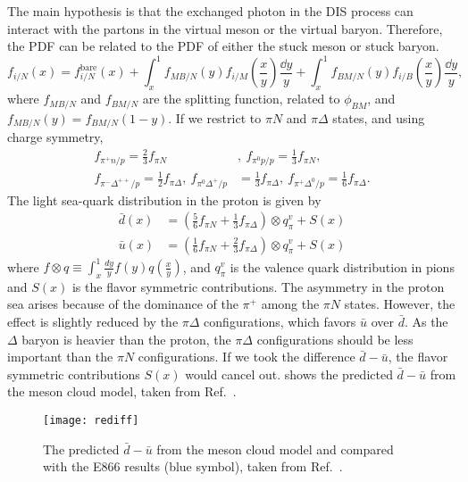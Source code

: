 \documentclass[../main.tex]{subfiles}
\begin{document}
The main hypothesis is that the exchanged photon in the DIS process can interact with the partons in the
virtual meson or the virtual
baryon. Therefore, the PDF can be related to the PDF of either the stuck meson or stuck baryon.
\begin{equation}
	f_{i/N}\left(x\right) = f_{i/N}^{\mathrm{bare}}\left(x\right) +  \int^1_x f_{MB/N}\left(y\right) f_{i/M}\left(\frac{x}{y}\right) \frac{\dd{y}}{y} + \int^1_x f_{BM/N}\left(y\right) f_{i/B}\left(\frac{x}{y}\right) \frac{\dd{y}}{y},
\end{equation}
where $f_{MB/N}$ and $f_{BM/N}$ are the splitting function, related to $\phi_{BM}$, and $f_{MB/N}(y)=f_{BM/N}(1-y)$.
If we restrict to $\pi N$ and $\pi\Delta$ states, and using charge symmetry,
\begin{align}
	f_{\pi^+n/p}=\frac{2}{3} f_{\pi N}                                       & , ~f_{\pi^0 p/p}=\frac{1}{3} f_{\pi N},                                         \\
	f_{\pi^-\Delta^{++}/p}=\frac{1}{2} f_{\pi \Delta}, ~f_{\pi^0 \Delta^+/p} & =\frac{1}{3} f_{\pi \Delta},  ~f_{\pi^+ \Delta^0/p}=\frac{1}{6} f_{\pi \Delta}.
\end{align}
The light sea-quark distribution in the proton is given by
\begin{align}
	\bar{d}(x) & = \left(\frac{5}{6}f_{\pi N} + \frac{1}{3}f_{\pi \Delta}\right)\otimes q^v_\pi + S(x) \\
	\bar{u}(x) & = \left(\frac{1}{6}f_{\pi N} + \frac{2}{3}f_{\pi \Delta}\right)\otimes q^v_\pi + S(x)
	\label{eq:pion_dbub}
\end{align}
where $f\otimes q\equiv \int^1_x \frac{dy}{y}f(y)q\left(\frac{x}{y}\right)$, and $q^v_\pi$ is the valence
quark distribution in pions and $S(x)$ is the flavor symmetric contributions.
The asymmetry in the proton sea arises because of the dominance of the $\pi^+$ among the $\pi N$ states.
However, the effect is slightly reduced by the $\pi\Delta$ configurations, which favors $\bar{u}$ over $\bar{d}$.
As the $\Delta$ baryon is heavier than the proton, the $\pi\Delta$ configurations should be less important than
the $\pi N$ configurations.
If we took the difference $\bar{d}-\bar{u}$, the flavor symmetric contributions $S(x)$ would cancel out.
shows the predicted $\bar{d}-\bar{u}$ from the meson cloud model, taken from Ref.~\cite{alberg2022}.
\begin{figure}
	\centering
	\texttt{[image: rediff]}
	\caption{The predicted $\bar{d}-\bar{u}$ from the meson cloud model and compared with the E866 results (blue symbol), taken from Ref.~\cite{alberg2022}.}
	\label{fig:pion_cloud}
\end{figure}
\end{document}

